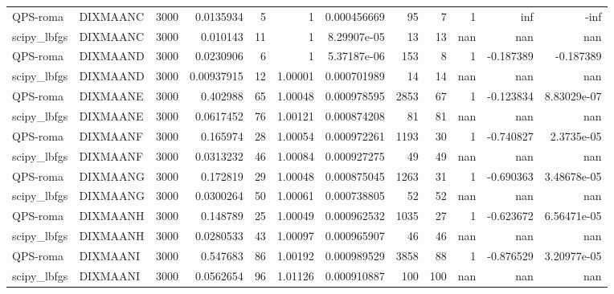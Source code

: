 \documentclass[a4paper]{article}
\begin{document}
\begin{tabular}{llrrrrrrrrrr}
	QPS-roma    & DIXMAANC &  3000 &  0.0135934  &      5 &      1           & 0.000456669 &       95 &        7 &        1 & inf           & -inf           \\
	scipy\_lbfgs & DIXMAANC &  3000 &  0.010143   &     11 &      1           & 8.29907e-05 &       13 &       13 &      nan & nan           &  nan           \\
	QPS-roma    & DIXMAAND &  3000 &  0.0230906  &      6 &      1           & 5.37187e-06 &      153 &        8 &        1 &  -0.187389    &   -0.187389    \\
	scipy\_lbfgs & DIXMAAND &  3000 &  0.00937915 &     12 &      1.00001     & 0.000701989 &       14 &       14 &      nan & nan           &  nan           \\
	QPS-roma    & DIXMAANE &  3000 &  0.402988   &     65 &      1.00048     & 0.000978595 &     2853 &       67 &        1 &  -0.123834    &    8.83029e-07 \\
	scipy\_lbfgs & DIXMAANE &  3000 &  0.0617452  &     76 &      1.00121     & 0.000874208 &       81 &       81 &      nan & nan           &  nan           \\
	QPS-roma    & DIXMAANF &  3000 &  0.165974   &     28 &      1.00054     & 0.000972261 &     1193 &       30 &        1 &  -0.740827    &    2.3735e-05  \\
	scipy\_lbfgs & DIXMAANF &  3000 &  0.0313232  &     46 &      1.00084     & 0.000927275 &       49 &       49 &      nan & nan           &  nan           \\
	QPS-roma    & DIXMAANG &  3000 &  0.172819   &     29 &      1.00048     & 0.000875045 &     1263 &       31 &        1 &  -0.690363    &    3.48678e-05 \\
	scipy\_lbfgs & DIXMAANG &  3000 &  0.0300264  &     50 &      1.00061     & 0.000738805 &       52 &       52 &      nan & nan           &  nan           \\
	QPS-roma    & DIXMAANH &  3000 &  0.148789   &     25 &      1.00049     & 0.000962532 &     1035 &       27 &        1 &  -0.623672    &    6.56471e-05 \\
	scipy\_lbfgs & DIXMAANH &  3000 &  0.0280533  &     43 &      1.00097     & 0.000965907 &       46 &       46 &      nan & nan           &  nan           \\
	QPS-roma    & DIXMAANI &  3000 &  0.547683   &     86 &      1.00192     & 0.000989529 &     3858 &       88 &        1 &  -0.876529    &    3.20977e-05 \\
	scipy\_lbfgs & DIXMAANI &  3000 &  0.0562654  &     96 &      1.01126     & 0.000910887 &      100 &      100 &      nan & nan           &  nan           \\

\end{tabular}
\end{document}
